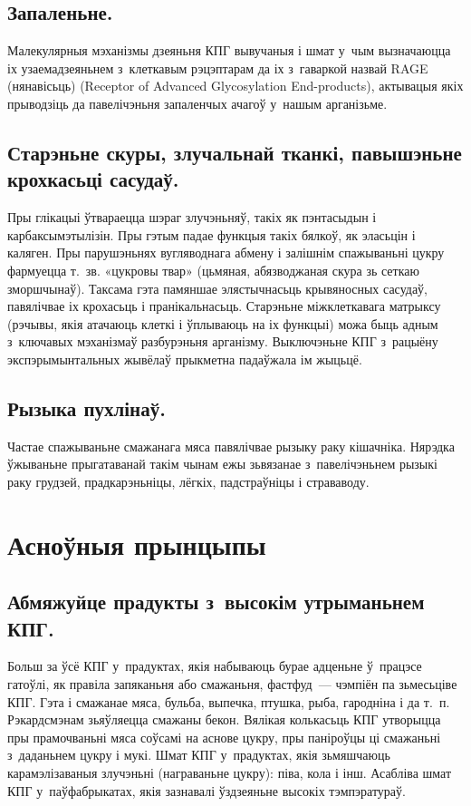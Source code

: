 \subsection{Запаленьне.}
Малекулярныя мэханізмы дзеяньня КПГ вывучаныя і шмат у~чым вызначаюцца іх узаемадзеяньнем з~клеткавым рэцэптарам да іх з~гаваркой назвай RAGE (нянавісьць) (Receptor of Advanced Glycosylation End-products), актывацыя якіх прыводзіць да павелічэньня запаленчых ачагоў у~нашым арганізьме.

\subsection{Старэньне скуры, злучальнай тканкі, павышэньне крохкасьці сасудаў.}
Пры глікацыі ўтвараецца шэраг злучэньняў, такіх як пэнтасыдын і карбаксымэтылізін. Пры гэтым падае функцыя такіх бялкоў, як эласьцін і каляген. Пры парушэньнях вугляводнага абмену і залішнім спажываньні цукру фармуецца т.~зв. «цукровы твар» (цьмяная, абязводжаная скура зь сеткаю зморшчынаў). Таксама гэта памяншае элястычнасьць крывяносных сасудаў, павялічвае іх крохасьць і пранікальнасьць. Старэньне міжклеткавага матрыксу (рэчывы, якія атачаюць клеткі і ўплываюць на іх функцыі) можа быць адным з~ключавых мэханізмаў разбурэньня арганізму. Выключэньне КПГ з~рацыёну экспэрымынтальных жывёлаў прыкметна падаўжала ім жыцьцё.


\subsection{Рызыка пухлінаў.}
Частае спажываньне смажанага мяса павялічвае рызыку раку кішачніка. Нярэдка ўжываньне прыгатаванай такім чынам ежы зьвязанае з~павелічэньнем рызыкі раку грудзей, прадкарэньніцы, лёгкіх, падстраўніцы і страваводу.

\section{Асноўныя прынцыпы}

\subsection{Абмяжуйце прадукты з~высокім утрыманьнем КПГ.}
Больш за ўсё КПГ у~прадуктах, якія набываюць бурае адценьне ў~працэсе гатоўлі, як правіла запяканьня або смажаньня, фастфуд~--- чэмпіён па зьмесьціве КПГ. Гэта і смажанае мяса, бульба, выпечка, птушка, рыба, гародніна і да т.~п. Рэкардсмэнам зьяўляецца смажаны бекон. Вялікая колькасьць КПГ утворыцца пры прамочваньні мяса соўсамі на аснове цукру, пры паніроўцы ці смажаньні з~даданьнем цукру і мукі. Шмат КПГ у~прадуктах, якія зьмяшчаюць карамэлізаваныя злучэньні (награваньне цукру): піва, кола і інш. Асабліва шмат КПГ у~паўфабрыкатах, якія зазнавалі ўздзеяньне высокіх тэмпэратураў.

